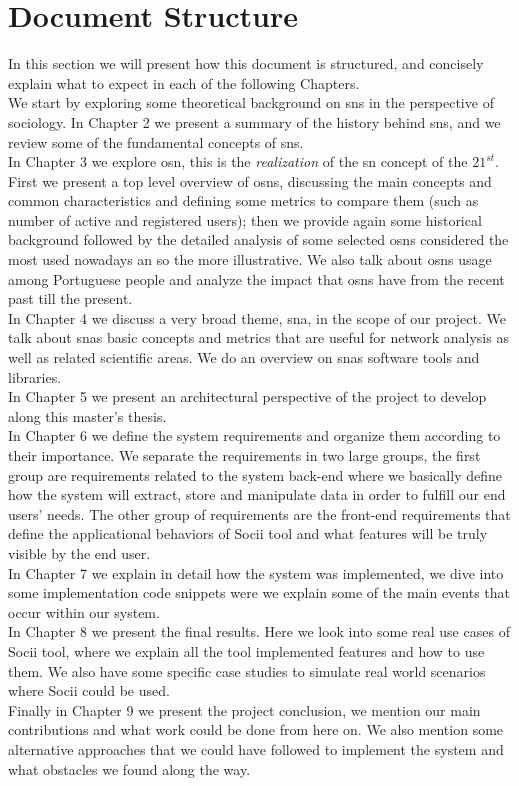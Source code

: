 \section{Document Structure}
In this section we will present how this document is structured, and concisely explain what to expect in each of the following Chapters.\\
\indent We start by exploring some theoretical background on \glspl{sn} in the perspective of sociology. In Chapter 2 we present a summary of the history behind \glspl{sn}, and we review some of the fundamental concepts of \glspl{sn}.\\
\indent In Chapter 3 we explore \acrfull{osn}, this is the \textit{realization} of the \gls{sn} concept of the $21^{st}$. First we present a top level overview of \glspl{osn}, discussing the main concepts and common characteristics and defining some metrics to compare them (such as number of active and registered users); then we provide again some historical background followed by the detailed analysis of some selected \glspl{osn} considered the most used nowadays an so the more illustrative. We also talk about \glspl{osn} usage among Portuguese people and analyze the impact that \glspl{osn} have from the recent past till the present.\\
\indent In Chapter 4 we discuss a very broad theme, \acrfull{sna}, in the scope of our project. We talk about \glspl{sna} basic concepts and metrics that are useful for network analysis as well as related scientific areas. We do an overview on \glspl{sna} software tools and libraries.\\
\indent In Chapter 5 we present an architectural perspective of the project to develop along this master's thesis.\\
\indent In Chapter 6 we define the system requirements and organize them according to their importance. We separate the requirements in two large groups, the first group are requirements related to the system back-end where we basically define how the system will extract, store and manipulate data in order to fulfill our end users' needs. The other group of requirements are the front-end requirements that define the applicational behaviors of Socii tool and what features will be truly visible by the end user.\\
\indent In Chapter 7 we explain in detail how the system was implemented, we dive into some implementation code snippets were we explain some of the main events that occur within our system.\\
\indent In Chapter 8 we present the final results. Here we look into some real use cases of Socii tool, where we explain all the tool implemented features and how to use them. We also have some specific case studies to simulate real world scenarios where Socii could be used.\\
\indent Finally in Chapter 9 we present the project conclusion, we mention our main contributions and what work could be done from here on. We also mention some alternative approaches that we could have followed to implement the system and what obstacles we found along the way.
